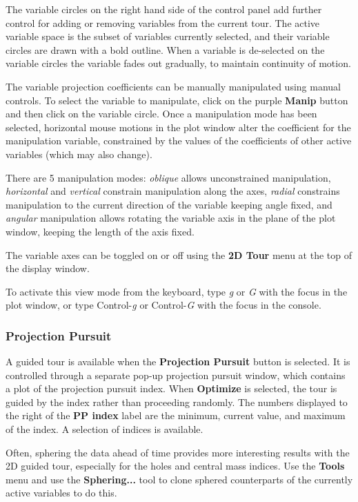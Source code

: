 \documentclass[11pt]{article}
\def\Widget#1{\textbf{#1}}
\begin{document}
The variable circles on the right hand side of the control panel add
further control for adding or removing variables from the current
tour. The active variable space is the subset of variables currently
selected, and their variable circles are drawn with a bold
outline. When a variable is de-selected on the variable circles the
variable fades out gradually, to maintain continuity of motion.

The variable projection coefficients can be manually manipulated using
manual controls. To select the variable to manipulate, click on the
purple \Widget{Manip} button and then click on the variable circle.
Once a manipulation mode has been selected, horizontal mouse motions
in the plot window alter the coefficient for the manipulation
variable, constrained by the values of the coefficients of other
active variables (which may also change).

There are 5 manipulation modes: {\it oblique} allows unconstrained
manipulation, {\it horizontal} and {\it vertical} constrain manipulation
along the axes, {\it radial} constrains manipulation to the current
direction of the variable keeping angle fixed, and {\it angular}
manipulation allows rotating the variable axis in the plane of the plot
window, keeping the length of the axis fixed.

The variable axes can be toggled on or off using the \Widget{2D Tour}
menu at the top of the display window.

To activate this view mode from the keyboard, type {\em g} or {\em G}
with the focus in the plot window, or type Control-{\em g} or
Control-{\em G} with the focus in the console.

\subsubsection{Projection Pursuit}

A guided tour is available when the \Widget{Projection Pursuit} button is
selected. It is controlled through a separate pop-up projection
pursuit window, which contains a plot of the projection pursuit index.
When \Widget{Optimize} is selected, the tour is guided by the index
rather than proceeding randomly.  The numbers displayed to the right
of the \Widget{PP index} label are the minimum, current value, and
maximum of the index.  A selection of indices is available.

Often, sphering the data ahead of time provides more interesting
results with the 2D guided tour, especially for the holes and central
mass indices. Use the \Widget{Tools} menu and use the
\Widget{Sphering...}  tool to clone sphered counterparts of the
currently active variables to do this.
\end{document}
